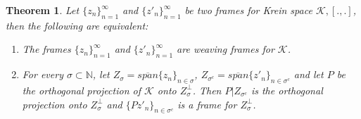 \documentclass[10pt,a4paper]{amsart}
\newtheorem{thm}{Theorem}
\begin{document}
\begin{thm}
	
	Let $\{z_n\}_{n=1}^\infty$ and $\{z'_n\}_{n=1}^\infty$ be two frames for Krein space $\mathcal{K},[., .]$, then the following are equivalent:
	
	\begin{enumerate}
	
	\item  The frames $\{z_n\}_{n=1}^\infty$ and $\{z'_n\}_{n=1}^\infty$ are weaving frames for $\mathcal{K}$.
	
\item	 For every $\sigma\subset \mathbb{N}$, let $Z_\sigma = \overline{span}\{z_n\}_{n \in\sigma}$,  $Z_{\sigma^{c}}= \overline{span}\{z'_n\}_{n \in\sigma^{c}}$ and let $P$ be the orthogonal projection of $\mathcal{K}$ onto $Z^\perp_{\sigma}$. Then $P|Z_{\sigma^{c}}$ is the orthogonal projection onto $Z^\perp_\sigma$ and $\{Pz'_n\}_ {n \in \sigma^c}$ is a frame for $Z^\perp_{\sigma}$.
		\end{enumerate}
\end{thm}
\end{document}
